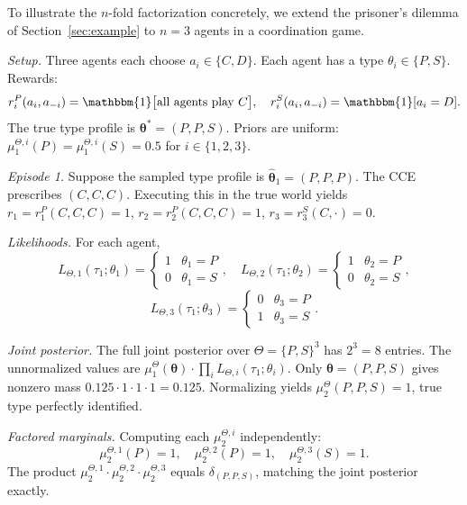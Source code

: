 \documentclass{article}
\begin{document}
To illustrate the $n$-fold factorization concretely, we extend the prisoner's dilemma of Section~\ref{sec:example} to $n=3$ agents in a coordination game.

\textit{Setup.} Three agents each choose $a_i \in \{C, D\}$. Each agent has a type $\theta_i \in \{P, S\}$. Rewards:
\begin{equation}
r_i^P(a_i, a_{-i}) = \mathbbm{1}\big[\text{all agents play } C\big], \quad r_i^S(a_i, a_{-i}) = \mathbbm{1}[a_i = D].
\end{equation}
The true type profile is $\boldsymbol{\theta}^* = (P, P, S)$. Priors are uniform: $\mu_1^{\Theta,i}(P) = \mu_1^{\Theta,i}(S) = 0.5$ for $i \in \{1,2,3\}$.

\textit{Episode 1.} Suppose the sampled type profile is $\hat{\boldsymbol{\theta}}_1 = (P, P, P)$. The CCE prescribes $(C, C, C)$. Executing this in the true world yields $r_1 = r_1^P(C,C,C) = 1$, $r_2 = r_2^P(C,C,C) = 1$, $r_3 = r_3^S(C, \cdot) = 0$.

\textit{Likelihoods.} For each agent,
\begin{equation}
L_{\Theta,1}(\tau_1; \theta_1) = \begin{cases} 1 & \theta_1 = P \\ 0 & \theta_1 = S \end{cases}, \quad
L_{\Theta,2}(\tau_1; \theta_2) = \begin{cases} 1 & \theta_2 = P \\ 0 & \theta_2 = S \end{cases},
\end{equation}
\begin{equation}
L_{\Theta,3}(\tau_1; \theta_3) = \begin{cases} 0 & \theta_3 = P \\ 1 & \theta_3 = S \end{cases}.
\end{equation}

\textit{Joint posterior.} The full joint posterior over $\Theta = \{P,S\}^3$ has $2^3 = 8$ entries. The unnormalized values are $\mu_1^\Theta(\boldsymbol{\theta}) \cdot \prod_i L_{\Theta,i}(\tau_1; \theta_i)$. Only $\boldsymbol{\theta} = (P,P,S)$ gives nonzero mass $0.125 \cdot 1 \cdot 1 \cdot 1 = 0.125$. Normalizing yields $\mu_2^\Theta(P,P,S) = 1$, true type perfectly identified.

\textit{Factored marginals.} Computing each $\mu_2^{\Theta,i}$ independently:
\begin{equation}
\mu_2^{\Theta,1}(P) = 1, \quad \mu_2^{\Theta,2}(P) = 1, \quad \mu_2^{\Theta,3}(S) = 1.
\end{equation}
The product $\mu_2^{\Theta,1} \cdot \mu_2^{\Theta,2} \cdot \mu_2^{\Theta,3}$ equals $\delta_{(P,P,S)}$, matching the joint posterior exactly.
\end{document}
